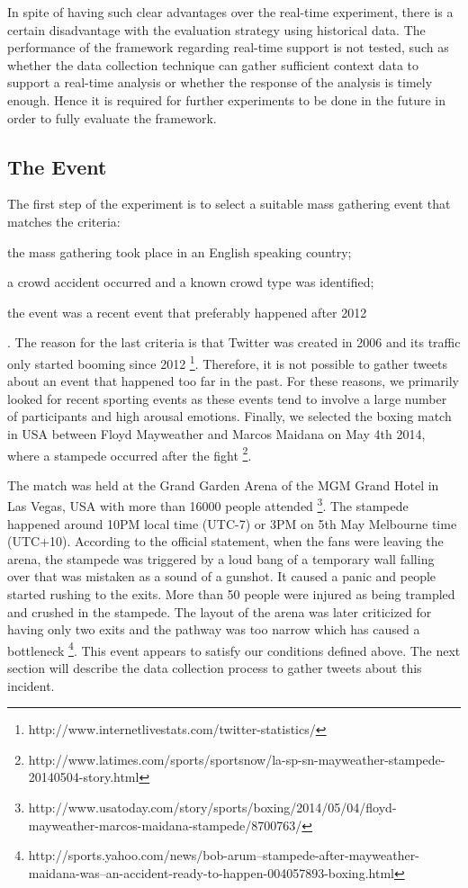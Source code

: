 In spite of having such clear advantages over the real-time experiment, there is a certain disadvantage with the evaluation strategy using historical data. The performance of the framework regarding real-time support is not tested, such as whether the data collection technique can gather sufficient context data to support a real-time analysis or whether the response of the analysis is timely enough. Hence it is required for further experiments to be done in the future in order to fully evaluate the framework.

\subsection{The Event}
The first step of the experiment is to select a suitable mass gathering event that matches the criteria:
\begin{inparaenum}[i)]
\item the mass gathering took place in an English speaking country;
\item a crowd accident occurred and a known crowd type was identified;
\item the event was a recent event that preferably happened after 2012
\end{inparaenum}. The reason for the last criteria is that Twitter was created in 2006 and its traffic only started booming since 2012 \footnote{http://www.internetlivestats.com/twitter-statistics/}. Therefore, it is not possible to gather tweets about an event that happened too far in the past. For these reasons, we primarily looked for recent sporting events as these events tend to involve a large number of participants and high arousal emotions. Finally, we selected the boxing match in USA between Floyd Mayweather and Marcos Maidana on May 4th 2014, where a stampede occurred after the fight \footnote{http://www.latimes.com/sports/sportsnow/la-sp-sn-mayweather-stampede-20140504-story.html}.

The match was held at the Grand Garden Arena of the MGM Grand Hotel in Las Vegas, USA with more than 16000 people attended \footnote{http://www.usatoday.com/story/sports/boxing/2014/05/04/floyd-mayweather-marcos-maidana-stampede/8700763/}. The stampede happened around 10PM local time (UTC-7) or 3PM on 5th May Melbourne time (UTC+10). According to the official statement, when the fans were leaving the arena, the stampede was triggered by a loud bang of a temporary wall falling over that was mistaken as a sound of a gunshot. It caused a panic and people started rushing to the exits. More than 50 people were injured as being trampled and crushed in the stampede. The layout of the arena was later criticized for having only two exits and the pathway was too narrow which has caused a bottleneck \footnote{http://sports.yahoo.com/news/bob-arum--stampede-after-mayweather-maidana-was--an-accident-ready-to-happen-004057893-boxing.html}. This event appears to satisfy our conditions defined above. The next section will describe the data collection process to gather tweets about this incident.


